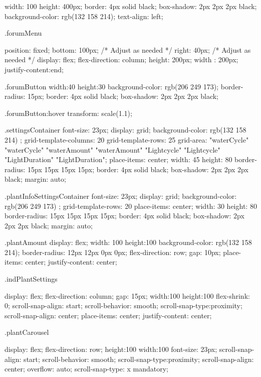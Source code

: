 \documentclass[12pt]{article} %
\begin{document}
\begin{htmlcode}[caption={CSS Stlye Sheet}]
{   width: 100%
   height: 400px;
   border: 4px solid black;
   box-shadow:  2px 2px 2px black;
   background-color: rgb(132 158 214);
   text-align: left;
}

.forumMenu
{ 
   position: fixed;
   bottom: 100px; /* Adjust as needed */
   right: 40px; /* Adjust as needed */
   display: flex;
   flex-direction: column;
   height: 200px;
   width : 200px;
   justify-content:end;


}

.forumButton
{
   width:40%
   height:30%
   background-color: rgb(206 249 173);
   border-radius: 15px;
   border: 4px solid black;
   box-shadow:  2px 2px 2px black;
}

.forumButton:hover
{
   transform: scale(1.1);
}


.settingsContainer
{
   font-size: 23px;
   display: grid;
   background-color: rgb(132 158 214) ;
   grid-template-columns: 20%
   grid-template-rows: 25%
   grid-area: 
   "waterCycle" "waterCycle"
   "waterAmount" "waterAmount"
   "Lightcycle" "Lightcycle"
   "LightDuration" "LightDuration";
   place-items: center;
   width: 45%
   height: 80%
   border-radius: 15px 15px 15px 15px;
   border: 4px solid black;
   box-shadow:  2px 2px 2px black;
   margin: auto;
}

.plantInfoSettingsContainer
{
   font-size: 23px;
   display: grid;
   background-color: rgb(206 249 173) ;
   grid-template-rows: 20%
   place-items: center;
   width: 30%
   height: 80%
   border-radius: 15px 15px 15px 15px;
   border: 4px solid black;
   box-shadow:  2px 2px 2px black;
   margin: auto;
}

.plantAmount
{
   display: flex;
   width: 100%
   height:100%
   background-color: rgb(132 158 214);
   border-radius: 12px 12px 0px 0px;
   flex-direction: row;
   gap: 10px;
   place-items: center;
   justify-content: center;
}

.indPlantSettings
{
   display: flex;
   flex-direction: column;
   gap: 15px;
   width:100%
   height:100%
   flex-shrink: 0;
   scroll-snap-align: start;
   scroll-behavior: smooth;
   scroll-snap-type:proximity;
   scroll-snap-align: center;
   place-items: center;
   justify-content: center;

}

.plantCarousel
{
   display: flex;
   flex-direction: row;
   height:100%
   width:100%
   font-size: 23px;
   scroll-snap-align: start;
   scroll-behavior: smooth;
   scroll-snap-type:proximity;
   scroll-snap-align: center;
   overflow: auto;
   scroll-snap-type: x mandatory;
   
}
\end{htmlcode}
\end{document}
